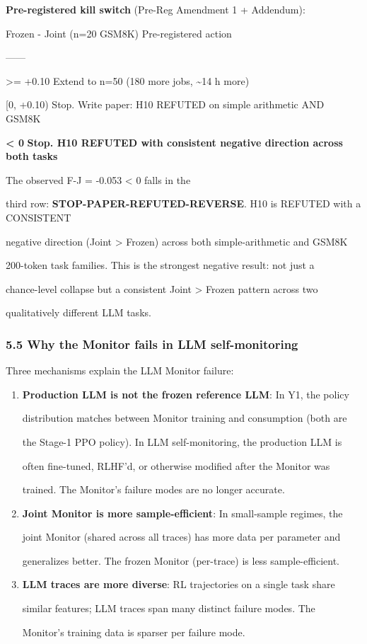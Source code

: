 \documentclass[
]{article}
\begin{document}
\textbf{Pre-registered kill switch} (Pre-Reg Amendment 1 + Addendum):

Frozen - Joint (n=20 GSM8K) \textbar{} Pre-registered action \textbar{}

\textbar---\textbar---\textbar{}

\textgreater= +0.10 \textbar{} Extend to n=50 (180 more jobs,
\textasciitilde14 h more) \textbar{}

{[}0, +0.10) \textbar{} Stop. Write paper: H10 REFUTED on simple
arithmetic AND GSM8K \textbar{}

\textbf{\textless{} 0} \textbar{} \textbf{Stop. H10 REFUTED with
consistent negative direction across both tasks} \textbar{}

The observed F-J = -0.053 \textless{} 0 falls in the

third row: \textbf{STOP-PAPER-REFUTED-REVERSE}. H10 is REFUTED with a
CONSISTENT

negative direction (Joint \textgreater{} Frozen) across both
simple-arithmetic and GSM8K

200-token task families. This is the strongest negative result: not just
a

chance-level collapse but a consistent Joint \textgreater{} Frozen
pattern across two

qualitatively different LLM tasks.

\subsubsection{5.5 Why the Monitor fails in LLM
self-monitoring}\label{why-the-monitor-fails-in-llm-self-monitoring}

Three mechanisms explain the LLM Monitor failure:

\begin{enumerate}
\def\labelenumi{\arabic{enumi}.}
\item
  \textbf{Production LLM is not the frozen reference LLM}: In Y1, the
  policy

  distribution matches between Monitor training and consumption (both
  are

  the Stage-1 PPO policy). In LLM self-monitoring, the production LLM is

  often fine-tuned, RLHF'd, or otherwise modified after the Monitor was

  trained. The Monitor's failure modes are no longer accurate.
\item
  \textbf{Joint Monitor is more sample-efficient}: In small-sample
  regimes, the

  joint Monitor (shared across all traces) has more data per parameter
  and

  generalizes better. The frozen Monitor (per-trace) is less
  sample-efficient.
\item
  \textbf{LLM traces are more diverse}: RL trajectories on a single task
  share

  similar features; LLM traces span many distinct failure modes. The

  Monitor's training data is sparser per failure mode.
\end{enumerate}
\end{document}
